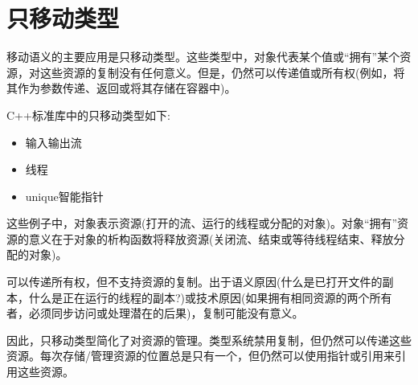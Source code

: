 \chapter{只移动类型}
移动语义的主要应用是只移动类型。这些类型中，对象代表某个值或“拥有”某个资源，对这些资源的复制没有任何意义。但是，仍然可以传递值或所有权(例如，将其作为参数传递、返回或将其存储在容器中)。

C++标准库中的只移动类型如下:

\begin{itemize}
	\item 输入输出流
	\item 线程
	\item unique智能指针
\end{itemize}

这些例子中，对象表示资源(打开的流、运行的线程或分配的对象)。对象“拥有”资源的意义在于对象的析构函数将释放资源(关闭流、结束或等待线程结束、释放分配的对象)。

可以传递所有权，但不支持资源的复制。出于语义原因(什么是已打开文件的副本，什么是正在运行的线程的副本?)或技术原因(如果拥有相同资源的两个所有者，必须同步访问或处理潜在的后果)，复制可能没有意义。

因此，只移动类型简化了对资源的管理。类型系统禁用复制，但仍然可以传递这些资源。每次存储/管理资源的位置总是只有一个，但仍然可以使用指针或引用来引用这些资源。


























































